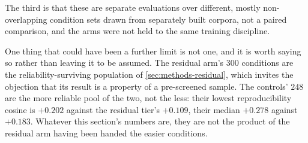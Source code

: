 The third is that these are separate evaluations over different, mostly
non-overlapping condition sets drawn from separately built corpora, not a paired
comparison, and the arms were not held to the same training discipline.

One thing that could have been a further limit is not one, and it is worth saying
so rather than leaving it to be assumed. The residual arm's $\num{300}$ conditions
are the reliability-surviving population of \cref{sec:methods-residual}, which
invites the objection that its result is a property of a pre-screened sample. The
controls' $\num{248}$ are the more reliable pool of the two, not the less: their
lowest reproducibility cosine is $+0.202$ against the residual tier's $+0.109$,
their median $+0.278$ against $+0.183$. Whatever this section's numbers are, they
are not the product of the residual arm having been handed the easier
conditions.

